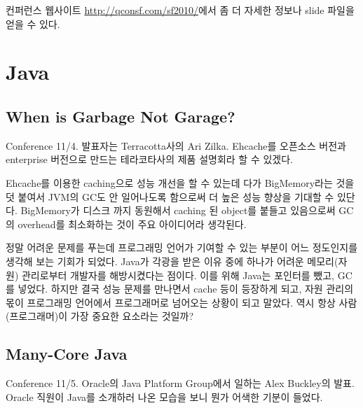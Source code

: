 \documentclass[11pt]{article}
\begin{document}
컨퍼런스 웹사이트 \url{http://qconsf.com/sf2010/}에서 좀 더 자세한 정보나 
slide 파일을 얻을 수 있다.


\section{Java}

\subsection{When is Garbage Not Garage?}

Conference 11/4. 발표자는 Terracotta사의 Ari Zilka.
Ehcache를 오픈소스 버전과 enterprise 버전으로 만드는 테라코타사의 제품 
설명회라 할 수 있겠다.
 
Ehcache를 이용한 caching으로 성능 개선을 할 수 있는데 다가
BigMemory라는 것을 덧 붙여서 JVM의 GC도 안 일어나도록 함으로써 더 높은
성능 향상을 기대할 수 있단다.
BigMemory가 디스크 까지 동원해서 caching 된 object를 붙들고 있음으로써
GC의 overhead를 최소화하는 것이 주요 아이디어라 생각된다.
 
정말 어려운 문제를 푸는데 프로그래밍 언어가 기여할 수 있는 부분이 어느 
정도인지를 생각해 보는 기회가 되었다.
Java가 각광을 받은 이유 중에 하나가 어려운 메모리(자원) 관리로부터 개발자를 
해방시켰다는 점이다. 이를 위해 Java는 포인터를 뺐고, GC를 넣었다. 
하지만 결국 성능 문제를 만나면서 cache 등이 등장하게 되고, 자원 관리의 몫이 
프로그래밍 언어에서 프로그래머로 넘어오는 상황이 되고 말았다.
역시 항상 사람(프로그래머)이 가장 중요한 요소라는 것일까?

\subsection{Many-Core Java}
\label{many core java}

Conference 11/5. Oracle의 Java Platform Group에서 일하는 Alex Buckley의 발표.
Oracle 직원이 Java를 소개하러 나온 모습을 보니 뭔가 어색한 기분이 들었다. 
\end{document}
